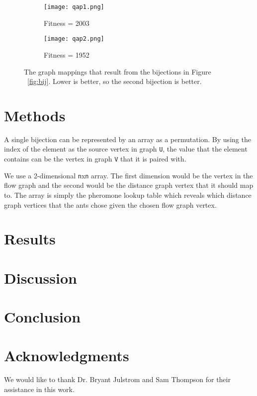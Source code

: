 \documentclass[sigconf]{acmart}
\begin{document}
\begin {figure}
\centering
\begin{subfigure}{.5\columnwidth}
	\centering
	\texttt{[image: qap1.png]}
	\caption{Fitness = 2003}
	\label{fig:sub1}
\end{subfigure}%
\begin{subfigure}{.5\columnwidth}
	\centering
	\texttt{[image: qap2.png]}
	\caption{Fitness = 1952}
	\label{fig:sub2}
\end{subfigure}
\caption {The graph mappings that result from the bijections in Figure ~\ref{fig:bij}. Lower is better, so the second bijection is better.}
\label{fig:qap}
\end {figure}

\section {Methods}
A single bijection can be represented by an array as a permutation. By using the index of the element as the source vertex in graph \verb|U|, the value that the element contains can be the vertex in graph \verb|V| that it is paired with.

We use a 2-dimensional \verb|n|x\verb|n| array. The first dimension would be the vertex in the flow graph and the second would be the distance graph vertex that it should map to. The array is simply the pheromone lookup table which reveals which distance graph vertices that the ants chose given the chosen flow graph vertex.

\section {Results}

\section {Discussion}

\section {Conclusion}

\section {Acknowledgments}
We would like to thank Dr. Bryant Julstrom and Sam Thompson for their assistance in this work.


{}
\end{document}

